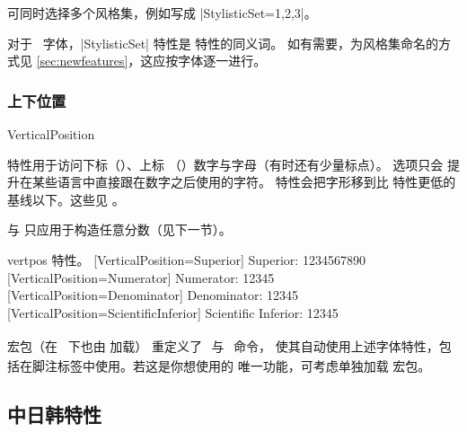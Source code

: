 \documentclass[a4paper]{l3doc}
\begin{document}
可同时选择多个风格集，例如写成 |StylisticSet={1,2,3}|。

对于 \AAT\ 字体，|StylisticSet| 特性是  特性的同义词。
如有需要，为风格集命名的方式见 \vref{sec:newfeatures}，这应按字体逐一进行。


\subsubsection{上下位置}

\begin{features}{VerticalPosition}
\end{features}

 特性用于访问下标（）、上标
（）数字与字母（有时还有少量标点）。 选项只会
提升在某些语言中直接跟在数字之后使用的字符。
特性会把字形移到比  特性更低的基线以下。这些见 。

 与  只应用于构造任意分数（见下一节）。

\begin{Lexample}{vertpos}{ 特性。}
  [VerticalPosition=Superior]
   Superior: 1234567890                                   \\
  [VerticalPosition=Numerator]
   Numerator: 12345                                       \\
  [VerticalPosition=Denominator]
   Denominator: 12345                                     \\
  [VerticalPosition=ScientificInferior]
   Scientific Inferior: 12345
\end{Lexample}

 宏包（在 \XeTeX\ 下也由  加载）
重定义了 \cmd\textsubscript\ 与 \cmd\textsuperscript\ 命令，
使其自动使用上述字体特性，包括在脚注标签中使用。若这是你想使用的
 唯一功能，可考虑单独加载  宏包。



\subsection{中日韩特性}
\end{document}
